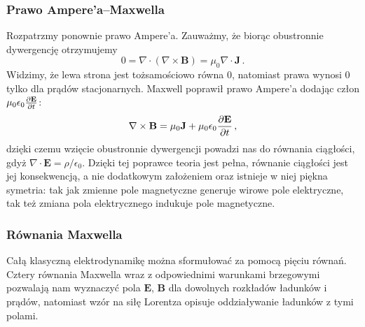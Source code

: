 \documentclass[../main.tex]{subfiles}
\begin{document}
\subsubsection{Prawo Ampere'a--Maxwella}
Rozpatrzmy ponownie prawo Ampere'a. Zauważmy, że biorąc obustronnie dywergencję otrzymujemy
\begin{equation*}
    0=\nabla\cdot(\nabla\times\mathbf{B})=\mu_0\nabla\cdot\mathbf{J}\,.
\end{equation*}
Widzimy, że lewa strona jest tożsamościowo równa 0, natomiast prawa wynosi 0 tylko dla prądów
stacjonarnych. Maxwell poprawił prawo Ampere'a dodając człon \(\mu_0\epsilon_0\pdv{\mathbf{E}}{t}\):
\begin{equation*}
    \nabla\times\mathbf{B}=\mu_0\mathbf{J}+\mu_0\epsilon_0\pdv{\mathbf{E}}{t}\,,
\end{equation*}
dzięki czemu wzięcie obustronnie dywergencji powadzi nas do równania ciągłości, gdyż
\(\nabla\cdot\mathbf{E}=\rho/\epsilon_0\). Dzięki tej poprawce teoria jest pełna, równanie ciągłości
jest jej konsekwencją, a nie dodatkowym założeniem oraz istnieje w niej piękna symetria: tak jak
zmienne pole magnetyczne generuje wirowe pole elektryczne, tak też zmiana pola elektrycznego
indukuje pole magnetyczne. 
\subsubsection{Równania Maxwella}
Całą klasyczną elektrodynamikę można sformułować za pomocą pięciu równań. Cztery równania Maxwella
wraz z odpowiednimi warunkami brzegowymi pozwalają nam wyznaczyć pola \(\mathbf{E}\), \(\mathbf{B}\)
dla dowolnych rozkładów ładunków i prądów, natomiast wzór na siłę Lorentza opisuje oddziaływanie
ładunków z tymi polami.
\medskip

\noindent{}
\medskip
\end{document}
